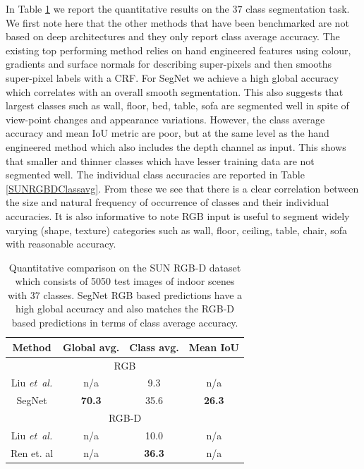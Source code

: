 In Table \ref{SUNRGBDtest} we report the quantitative results on the $37$ class segmentation task. We first note here that the other methods that have been benchmarked are not based on deep architectures and they only report class average accuracy. The existing top performing method \citep{ren2012rgb} relies on hand engineered features using colour, gradients and surface normals for describing super-pixels and then smooths super-pixel labels with a CRF. For SegNet we achieve a high global accuracy which correlates with an overall smooth segmentation. This also suggests that largest classes such as wall, floor, bed, table, sofa are segmented well in spite of view-point changes and appearance variations. However, the class average accuracy and mean IoU metric are poor, but at the same level as the hand engineered method which also includes the depth channel as input. This shows that smaller and thinner classes which have lesser training data are not segmented well. The individual class accuracies are reported in Table \ref{SUNRGBDClassavg}. From these we see that there is a clear correlation between the size and natural frequency of occurrence of classes and their individual accuracies. It is also informative to note RGB input is useful to segment widely varying (shape, texture) categories such as wall, floor, ceiling, table, chair, sofa with reasonable accuracy.

\begin{table}[t]
\centering
\begin{tabular}{c|ccc}
{Method} & {Global avg.} & {Class avg.} & {Mean IoU} \\ \hline \hline
\multicolumn{4}{c}{RGB}                                                        \\ \hline
Liu \emph{et~al.}  \citep{SIFT_flow}      & n/a                  & 9.3                & n/a               \\ \hline
SegNet            & \textbf{70.3}                & 35.6               & \textbf{26.3}            \\ \hline
\multicolumn{4}{c}{RGB-D}                                                       \\ \hline
Liu \emph{et~al.}   \citep{SIFT_flow}    & n/a                  & 10.0               & n/a               \\ \hline
Ren et. al \citep{ren2012rgb}     & n/a                  & \textbf{36.3}               & n/a               \\ \hline
\end{tabular}
\caption[SegNet quantitative results on the SUN RGB-D dataset.]{Quantitative comparison on the SUN RGB-D dataset which consists of 5050 test images of indoor scenes with 37 classes. SegNet RGB based predictions have a high global accuracy and also matches the RGB-D based predictions \citep{ren2012rgb} in terms of class average accuracy.}
\label{SUNRGBDtest}
\end{table}

